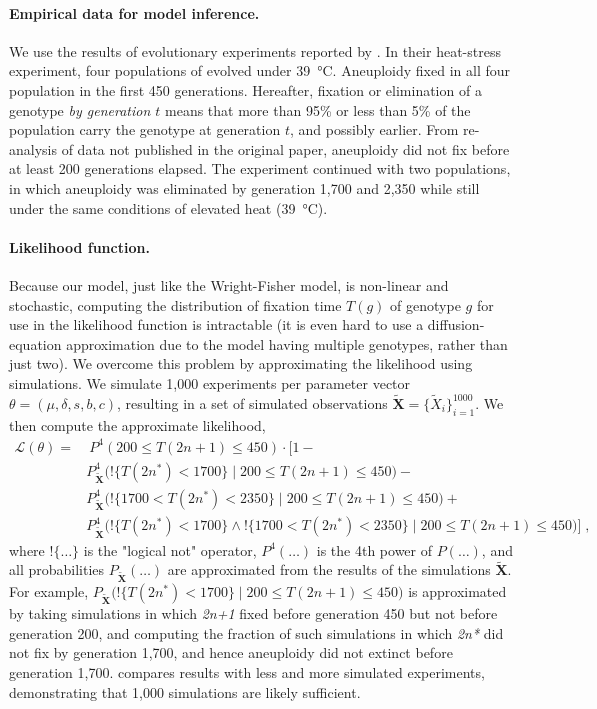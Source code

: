 \documentclass[12pt]{extarticle}
\let\vec\mathbf
\newcommand{\likelihood}{\mathcal{L}}
\newcommand{\anwt}{\emph{2n+1}}
\newcommand{\eumt}{\emph{2n*}}
\begin{document}
\paragraph{Empirical data for model inference.}

We use the results of evolutionary experiments reported by \citet{Yona2012}.
In their heat-stress experiment, four populations of \yeast evolved under \SI{39}{\celsius}. Aneuploidy fixed in all four population in the first 450 generations. Hereafter, fixation or elimination of a genotype \emph{by generation $t$} means that more than 95\% or less than 5\% of the population carry the genotype at generation $t$, and possibly earlier. 
From re-analysis of data not published in the original paper, aneuploidy did not fix before at least 200 generations elapsed.
The experiment continued with two populations, in which aneuploidy was eliminated by generation 1,700 and 2,350 while still under the same conditions of elevated heat (\SI{39}{\celsius}).


\paragraph{Likelihood function.} 
Because our model, just like the Wright-Fisher model, is non-linear and stochastic, computing the distribution of fixation time $T(g)$ of genotype $g$ for use in the likelihood function is intractable (it is even hard to use a diffusion-equation approximation due to the model having multiple genotypes, rather than just two).
We overcome this problem by approximating the likelihood using simulations. We simulate 1,000 experiments per parameter vector $\theta = (\mu, \delta, s, b, c)$, resulting in a set of simulated observations $\tilde{\vec X} = \{\tilde{X}_i\}_{i=1}^{1000}$. We then compute the approximate likelihood,
\begin{equation}\begin{aligned}
\label{eq:heatstress-likelihood}
\likelihood(\theta) = &\ P^4(200 \le T(2n+1) \le 450) \cdot 
	\Big[1 - \\
	&	P_{\tilde{\vec X}}^4\big(!\{T(2n^*)<1700\} \mid 200 \le T(2n+1) \le 450\big)- \\
	&	P_{\tilde{\vec X}}^4\big(!\{1700 < T(2n^*) < 2350\} \mid 200 \le T(2n+1) \le 450\big)+ \\
	&	P_{\tilde{\vec X}}^4\big(!\{T(2n^*)<1700\} \land !\{1700 < T(2n^*) < 2350\} \mid 200 \le T(2n+1) \le 450\big) 
	\Big]\;,
\end{aligned}\end{equation}
where $!\{\ldots\}$ is the "logical not" operator, $P^4(\ldots)$ is the 4th power of $P(\ldots)$, and all probabilities $P_{\tilde{\vec X}}(\ldots)$ are approximated from the results of the simulations $\tilde{\vec X}$. For example, $P_{\tilde{\vec X}}\big(!\{T(2n^*)<1700\} \mid 200 \le T(2n+1) \le 450\big)$ is approximated by taking simulations in which \anwt\; fixed before generation 450 but not before generation 200, and computing the fraction of such simulations in which \eumt\; did not fix by generation 1,700, and hence aneuploidy did not extinct before generation 1,700.
 compares results with less and more simulated experiments, demonstrating that 1,000 simulations are likely sufficient.
 
\end{document}
